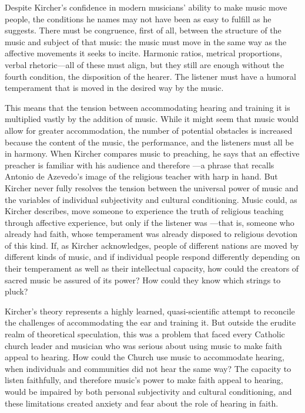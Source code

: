 Despite Kircher's confidence in modern musicians' ability to make music move
people, the conditions he names may not have been as easy to fulfill as he
suggests.
There must be congruence, first of all, between the structure of the music and
subject of that music: the music must move in the same way as the affective
movements it seeks to incite.
Harmonic ratios, metrical proportions, verbal rhetoric---all of these must
align, but they still are enough without the fourth condition, the disposition
of the hearer.
The listener must have a humoral temperament that is moved in the desired way by
the music.

This means that the tension between accommodating hearing and training it is
multiplied vastly by the addition of music.
While it might seem that music would allow for greater accommodation, the number
of potential obstacles is increased because the content of the music, the
performance, and the listeners must all be in harmony.
When Kircher compares music to preaching, he says that an effective preacher is
familiar with his audience and therefore ---a phrase that recalls Antonio de Azevedo's image of the religious
teacher with harp in hand.%
    \Autocite[551]{Kircher:Musurgia}
But Kircher never fully resolves the tension between the universal power of
music and the variables of individual subjectivity and cultural conditioning.
Music could, as Kircher describes, move someone to experience the truth of
religious teaching through affective experience, but only if the listener was
---that is, someone who already
had faith, whose temperament was already disposed to religious devotion of this
kind.
If, as Kircher acknowledges, people of different nations are moved by different
kinds of music, and if individual people respond differently depending on their
temperament as well as their intellectual capacity, how could the creators of
sacred music be assured of its power?
How could they know which strings to pluck?

Kircher's theory represents a highly learned, quasi-scientific attempt to
reconcile the challenges of accommodating the ear and training it.
But outside the erudite realm of theoretical speculation, this was a problem
that faced every Catholic church leader and musician who was serious about using
music to make faith appeal to hearing.
How could the Church use music to accommodate hearing, when individuals and
communities did not hear the same way?
The capacity to listen faithfully, and therefore music's power to make faith
appeal to hearing, would be impaired by both personal subjectivity and cultural
conditioning, and these limitations created anxiety and fear about the role of
hearing in faith.

